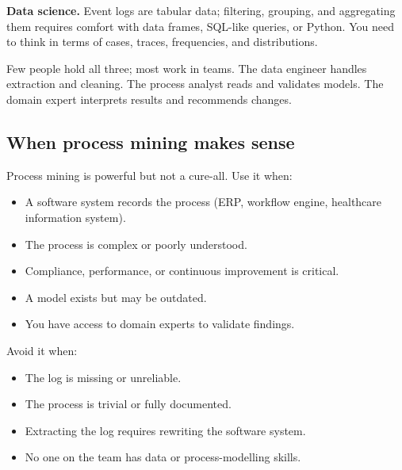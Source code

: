 \textbf{Data science.} Event logs are tabular data; filtering, grouping, and aggregating them requires comfort with data frames, SQL-like queries, or Python. You need to think in terms of cases, traces, frequencies, and distributions.

Few people hold all three; most work in teams. The data engineer handles extraction and cleaning. The process analyst reads and validates models. The domain expert interprets results and recommends changes.

\subsection{When process mining makes sense}

Process mining is powerful but not a cure-all. Use it when:
\begin{itemize}
  \item A software system records the process (ERP, workflow engine, healthcare information system).
  \item The process is complex or poorly understood.
  \item Compliance, performance, or continuous improvement is critical.
  \item A model exists but may be outdated.
  \item You have access to domain experts to validate findings.
\end{itemize}

Avoid it when:
\begin{itemize}
  \item The log is missing or unreliable.
  \item The process is trivial or fully documented.
  \item Extracting the log requires rewriting the software system.
  \item No one on the team has data or process-modelling skills.
\end{itemize}
